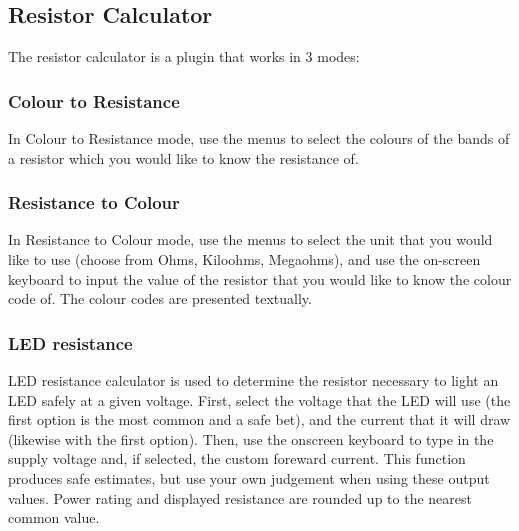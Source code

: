 \subsection{Resistor Calculator}

The resistor calculator is a plugin that works in 3 modes:

\subsubsection{Colour to Resistance}

In Colour to Resistance mode, use the menus to select the colours of the
bands of a resistor which you would like to know the resistance of.
   
\subsubsection{Resistance to Colour}

In Resistance to Colour mode, use the menus to select the unit that you
would like to use (choose from Ohms, Kiloohms, Megaohms), and use
the on-screen keyboard to input the value of the resistor that you would
like to know the colour code of. The colour codes are presented
 textually.

\subsubsection{LED resistance}

LED resistance calculator is used to determine the resistor necessary to light
an LED safely at a given voltage. First, select the voltage that the LED will
use (the first option is the most common and a safe bet), and the current
that it will draw (likewise with the first option). Then, use the onscreen
keyboard to type in the supply voltage and, if selected, the custom 
foreward current. This function produces safe estimates, but use your own
judgement when using these output values. Power rating and displayed resistance
are rounded up to the nearest common value.
